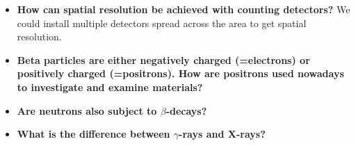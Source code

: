 \begin{itemize}
	\item \textbf{How can spatial resolution be achieved with
		counting detectors?}
	We could install multiple detectors spread across the area to get spatial resolution.
	
	\item \textbf{Beta particles are either negatively charged
		(=electrons) or positively charged (=positrons).
		How are positrons used nowadays to investigate
		and examine materials?}
	
	\item \textbf{Are neutrons also subject to $\beta$-decays?}

	\item \textbf{What is the difference between $\gamma$-rays and X-rays?}
	

\end{itemize}
